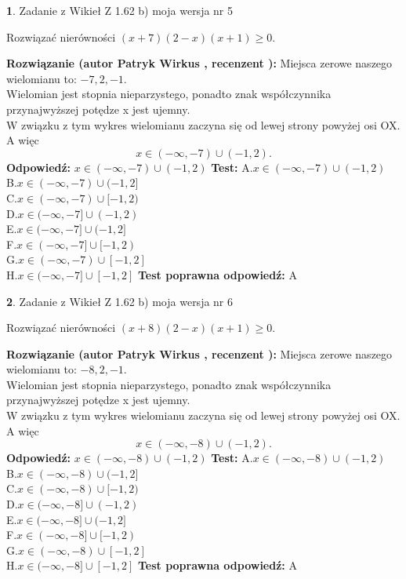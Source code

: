 \documentclass[12pt, a4paper]{article}
\theoremstyle{definition} %
\newtheorem{zad}{}
\newcommand{\zadStart}[1]{\begin{zad}#1\newline}
\newcommand{\zadStop}{\end{zad}}
\newcommand{\rozwStart}[2]{\noindent \textbf{Rozwiązanie (autor #1 , recenzent #2): }\newline}
\newcommand{\rozwStop}{\newline}
\newcommand{\odpStart}{\noindent \textbf{Odpowiedź:}\newline}
\newcommand{\odpStop}{\newline}
\newcommand{\testStart}{\noindent \textbf{Test:}\newline}
\newcommand{\testStop}{\newline}
\newcommand{\kluczStart}{\noindent \textbf{Test poprawna odpowiedź:}\newline}
\newcommand{\kluczStop}{\newline}
\begin{document}
\zadStart{Zadanie z Wikieł Z 1.62 b) moja wersja nr 5}

Rozwiązać nierówności $(x+7)(2-x)(x+1)\ge0$.
\zadStop
\rozwStart{Patryk Wirkus}{}
Miejsca zerowe naszego wielomianu to: $-7, 2, -1$.\\
Wielomian jest stopnia nieparzystego, ponadto znak współczynnika przy\linebreak najwyższej potędze x jest ujemny.\\ W związku z tym wykres wielomianu zaczyna się od lewej strony powyżej osi OX. A więc $$x \in (-\infty,-7) \cup (-1,2).$$
\rozwStop
\odpStart
$x \in (-\infty,-7) \cup (-1,2)$
\odpStop
\testStart
A.$x \in (-\infty,-7) \cup (-1,2)$\\
B.$x \in (-\infty,-7) \cup (-1,2]$\\
C.$x \in (-\infty,-7) \cup [-1,2)$\\
D.$x \in (-\infty,-7] \cup (-1,2)$\\
E.$x \in (-\infty,-7] \cup (-1,2]$\\
F.$x \in (-\infty,-7] \cup [-1,2)$\\
G.$x \in (-\infty,-7) \cup [-1,2]$\\
H.$x \in (-\infty,-7] \cup [-1,2]$
\testStop
\kluczStart
A
\kluczStop



\zadStart{Zadanie z Wikieł Z 1.62 b) moja wersja nr 6}

Rozwiązać nierówności $(x+8)(2-x)(x+1)\ge0$.
\zadStop
\rozwStart{Patryk Wirkus}{}
Miejsca zerowe naszego wielomianu to: $-8, 2, -1$.\\
Wielomian jest stopnia nieparzystego, ponadto znak współczynnika przy\linebreak najwyższej potędze x jest ujemny.\\ W związku z tym wykres wielomianu zaczyna się od lewej strony powyżej osi OX. A więc $$x \in (-\infty,-8) \cup (-1,2).$$
\rozwStop
\odpStart
$x \in (-\infty,-8) \cup (-1,2)$
\odpStop
\testStart
A.$x \in (-\infty,-8) \cup (-1,2)$\\
B.$x \in (-\infty,-8) \cup (-1,2]$\\
C.$x \in (-\infty,-8) \cup [-1,2)$\\
D.$x \in (-\infty,-8] \cup (-1,2)$\\
E.$x \in (-\infty,-8] \cup (-1,2]$\\
F.$x \in (-\infty,-8] \cup [-1,2)$\\
G.$x \in (-\infty,-8) \cup [-1,2]$\\
H.$x \in (-\infty,-8] \cup [-1,2]$
\testStop
\kluczStart
A
\kluczStop
\end{document}
